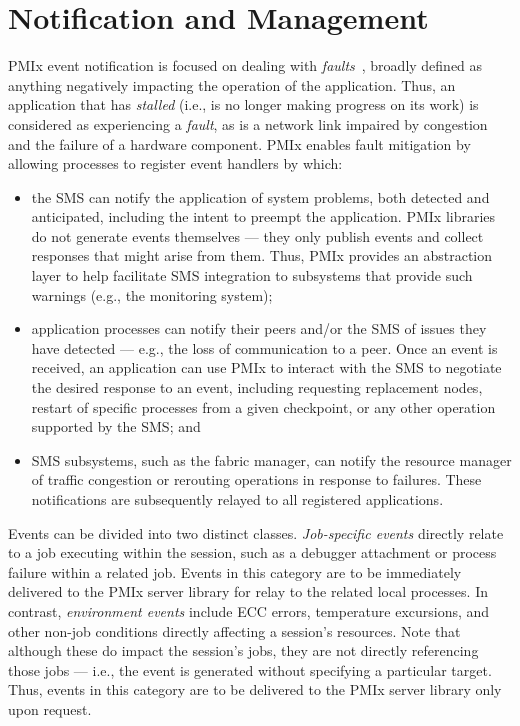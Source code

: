 \section{Notification and Management}
\label{chap:api_event:notify}

\ac{PMIx} event notification  is focused on dealing with \textit{faults}~\cite{event1,event2}, broadly defined as anything negatively impacting the operation of the application. Thus, an application that has \textit{stalled} (i.e., is no longer making progress on its work) is considered as experiencing a \textit{fault}, as is a network link impaired by congestion and the failure of a hardware component. \ac{PMIx} enables fault mitigation by allowing processes to register event handlers by which:

\begin{itemize}
\item the \ac{SMS} can notify the application of system problems, both detected and anticipated, including the intent to preempt the application. \ac{PMIx} libraries do not generate events themselves --- they only publish events and collect responses that might arise from them. Thus, \ac{PMIx} provides an abstraction layer to help facilitate \ac{SMS} integration to subsystems that provide such warnings (e.g., the monitoring system);

\item application processes can notify their peers and/or the \ac{SMS} of issues they have detected --- e.g., the loss of communication to a peer. Once an event is received, an application can use \ac{PMIx} to interact with the \ac{SMS} to negotiate the desired response to an event, including requesting replacement nodes, restart of specific processes from a given checkpoint, or any other operation supported by the \ac{SMS}; and

\item \ac{SMS} subsystems, such as the fabric manager, can notify the resource manager of traffic congestion or rerouting operations in response to failures. These notifications are subsequently relayed to all registered applications.
\end{itemize}

Events can be divided into two distinct classes. \textit{Job-specific events} directly relate to a job executing within the session, such as a debugger attachment or process failure within a related job. Events in this category are to be immediately delivered to the \ac{PMIx} server library for relay to the related local processes. In contrast, \textit{environment events} include \ac{ECC} errors, temperature excursions, and other non-job conditions directly affecting a session's resources. Note that although these do impact the session's jobs, they are not directly referencing those jobs --- i.e., the event is generated without specifying a particular target. Thus, events in this category are to be delivered to the \ac{PMIx} server library only upon request.

